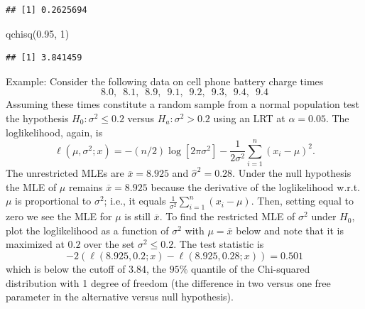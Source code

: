 \documentclass[
]{book}
\newenvironment{Shaded}{\begin{snugshade}}{\end{snugshade}}
\newcommand{\DecValTok}[1]{\textcolor[rgb]{0.00,0.00,0.81}{#1}}
\newcommand{\FloatTok}[1]{\textcolor[rgb]{0.00,0.00,0.81}{#1}}
\newcommand{\FunctionTok}[1]{\textcolor[rgb]{0.00,0.00,0.00}{#1}}
\newcommand{\NormalTok}[1]{#1}
\begin{document}
\begin{verbatim}
## [1] 0.2625694
\end{verbatim}

\begin{Shaded}
\begin{Highlighting}[]
\FunctionTok{qchisq}\NormalTok{(}\FloatTok{0.95}\NormalTok{, }\DecValTok{1}\NormalTok{)}
\end{Highlighting}
\end{Shaded}

\begin{verbatim}
## [1] 3.841459
\end{verbatim}

Example: Consider the following data on cell phone battery charge times
\[8.0, \,\,\, 8.1, \,\,\, 8.9, \,\,\, 9.1, \,\,\, 9.2, \,\,\, 9.3, \,\,\, 9.4, \,\,\, 9.4\]
Assuming these times constitute a random sample from a normal population test the hypothesis \(H_0:\sigma^2 \leq 0.2\) versus \(H_a:\sigma^2 > 0.2\) using an LRT at \(\alpha = 0.05\).
The loglikelihood, again, is
\[\ell(\mu, \sigma^2; x) = -(n/2)\log [2\pi\sigma^2] - \frac{1}{2\sigma^2}\sum_{i=1}^n(x_i - \mu)^2.\]
The unrestricted MLEs are \(\overline x = 8.925\) and \(\hat\sigma^2 = 0.28\). Under the null hypothesis the MLE of \(\mu\) remains \(\overline x = 8.925\) because the derivative of the loglikelihood w.r.t. \(\mu\) is proportional to \(\sigma^2\); i.e., it equals \(\frac{1}{\sigma^2}\sum_{i=1}^n (x_i - \mu)\). Then, setting equal to zero we see the MLE for \(\mu\) is still \(\overline x\). To find the restricted MLE of \(\sigma^2\) under \(H_0\), plot the loglikelihood as a function of \(\sigma^2\) with \(\mu = \overline x\) below and note that it is maximized at \(0.2\) over the set \(\sigma^2 \leq 0.2\). The test statistic is
\[-2(\ell(8.925,0.2;x) - \ell(8.925,0.28;x)) = 0.501\]
which is below the cutoff of 3.84, the \(95\%\) quantile of the Chi-squared distribution with 1 degree of freedom (the difference in two versus one free parameter in the alternative versus null hypothesis).
\end{document}
